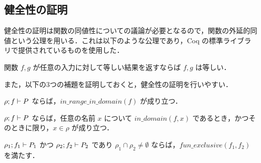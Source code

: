 


\subsection{健全性の証明}


健全性の証明は関数の同値性についての議論が必要となるので，関数の外延的同値という公理を用いる．これは以下のような公理であり，Coq の標準ライブラリで提供されているものを使用した．%

\begin{axm}[関数の外延的同値]
  関数 $ f, g $ が任意の入力に対して等しい結果を返すならば $ f, g $ は等しい．
\end{axm}




また，以下の3つの補題を証明しておくと，健全性の証明を行いやすい．


\begin{lem}[定義域と値域の一致]
  \label{lemma:typing_range_domain}
  $\rho ; f \vdash P$ ならば，$in\_range\_in\_domain(f)$ が成り立つ．
\end{lem}

\begin{lem}
  \label{lemma:typing_recep_domain}
  $\rho ; f \vdash P$ ならば，任意の名前 $ x $ について $in\_domain(f, x) $ であるとき，かつそのときに限り，$ x \in \rho $ が成り立つ．
\end{lem}

\begin{lem}
  \label{lemma:typing_fun_exclusive}
  $\rho_1 ; f_1 \vdash P_1$ かつ $\rho_2 ; f_2 \vdash P_2$ であり $ \rho_1 \cap \rho_2 \neq \emptyset $ ならば，$fun\_exclusive(f_1, f_2)$ を満たす．
\end{lem}

